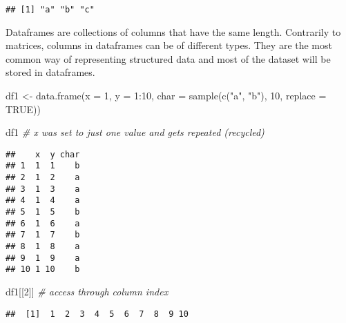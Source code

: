\documentclass[
  oneside]{book}
\newenvironment{Shaded}{\begin{snugshade}}{\end{snugshade}}
\newcommand{\AttributeTok}[1]{\textcolor[rgb]{0.77,0.63,0.00}{#1}}
\newcommand{\CommentTok}[1]{\textcolor[rgb]{0.56,0.35,0.01}{\textit{#1}}}
\newcommand{\ConstantTok}[1]{\textcolor[rgb]{0.00,0.00,0.00}{#1}}
\newcommand{\DecValTok}[1]{\textcolor[rgb]{0.00,0.00,0.81}{#1}}
\newcommand{\FunctionTok}[1]{\textcolor[rgb]{0.00,0.00,0.00}{#1}}
\newcommand{\NormalTok}[1]{#1}
\newcommand{\OtherTok}[1]{\textcolor[rgb]{0.56,0.35,0.01}{#1}}
\newcommand{\SpecialCharTok}[1]{\textcolor[rgb]{0.00,0.00,0.00}{#1}}
\newcommand{\StringTok}[1]{\textcolor[rgb]{0.31,0.60,0.02}{#1}}
\begin{document}
\begin{Shaded}
\end{Shaded}

\begin{verbatim}
## [1] "a" "b" "c"
\end{verbatim}

Dataframes are collections of columns that have the same length.
Contrarily to matrices, columns in dataframes can be of different types.
They are the most common way of representing structured data and
most of the dataset will be stored in dataframes.

\begin{Shaded}
\begin{Highlighting}[]
\NormalTok{df1 }\OtherTok{\textless{}{-}} \FunctionTok{data.frame}\NormalTok{(}\AttributeTok{x =} \DecValTok{1}\NormalTok{, }\AttributeTok{y =} \DecValTok{1}\SpecialCharTok{:}\DecValTok{10}\NormalTok{,}
           \AttributeTok{char =} \FunctionTok{sample}\NormalTok{(}\FunctionTok{c}\NormalTok{(}\StringTok{"a"}\NormalTok{, }\StringTok{"b"}\NormalTok{), }\DecValTok{10}\NormalTok{, }\AttributeTok{replace =} \ConstantTok{TRUE}\NormalTok{))}

\NormalTok{df1 }\CommentTok{\# x was set to just one value and gets repeated (\textquotesingle{}recycled\textquotesingle{})}
\end{Highlighting}
\end{Shaded}

\begin{verbatim}
##    x  y char
## 1  1  1    b
## 2  1  2    a
## 3  1  3    a
## 4  1  4    a
## 5  1  5    b
## 6  1  6    a
## 7  1  7    b
## 8  1  8    a
## 9  1  9    a
## 10 1 10    b
\end{verbatim}

\begin{Shaded}
\begin{Highlighting}[]
\NormalTok{df1[[}\DecValTok{2}\NormalTok{]] }\CommentTok{\# access through column index}
\end{Highlighting}
\end{Shaded}

\begin{verbatim}
##  [1]  1  2  3  4  5  6  7  8  9 10
\end{verbatim}

\begin{Shaded}
\end{Shaded}
\end{document}
